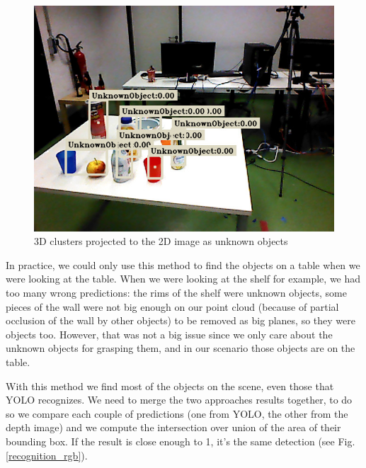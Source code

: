 \documentclass[a4paper, twocolumn]{article}
\begin{document}
    \begin{figure}
        \includegraphics[width=\columnwidth]{../img/cluster_obj_rgb.jpg}
        \caption{3D clusters projected to the 2D image as unknown objects}
        \label{rgb_clust}
    \end{figure}

    In practice, we could only use this method to find the objects on a table when we were looking at the table. When we were looking at the shelf for example, we had too many wrong predictions: the rims of the shelf were unknown objects, some pieces of the wall were not big enough on our point cloud (because of partial occlusion of the wall by other objects) to be removed as big planes, so they were objects too. However, that was not a big issue since we only care about the unknown objects for grasping them, and in our scenario those objects are on the table.

    With this method we find most of the objects on the scene, even those that YOLO recognizes. We need to merge the two approaches results together, to do so we compare each couple of predictions (one from YOLO, the other from the depth image) and we compute the intersection over union of the area of their bounding box. If the result is close enough to 1, it's the same detection (see Fig. \ref{recognition_rgb}).
\end{document}
